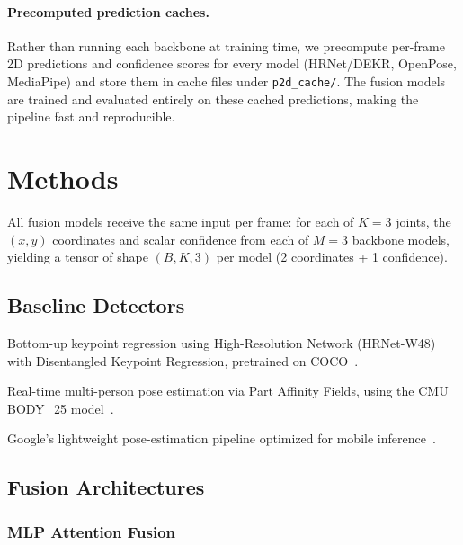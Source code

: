 \documentclass[11pt,a4paper]{article}
\begin{document}
\paragraph{Precomputed prediction caches.}
Rather than running each backbone at training time, we precompute per-frame
2D predictions and confidence scores for every model (HRNet/DEKR, OpenPose,
MediaPipe) and store them in cache files under \texttt{p2d\_cache/}.  The
fusion models are trained and evaluated entirely on these cached predictions,
making the pipeline fast and reproducible.

\section{Methods}\label{sec:methods}

All fusion models receive the same input per frame: for each of $K{=}3$ joints,
the $(x,y)$ coordinates and scalar confidence from each of $M{=}3$ backbone
models, yielding a tensor of shape $(B, K, 3)$ per model (2 coordinates + 1
confidence).

\subsection{Baseline Detectors}\label{sec:baselines}

\begin{description}[nosep, leftmargin=1em]
    \item[HRNet/DEKR] Bottom-up keypoint regression using High-Resolution
        Network (HRNet-W48) with Disentangled Keypoint Regression, pretrained
        on COCO~\cite{geng2021dekr, sun2019hrnet}.
    \item[OpenPose] Real-time multi-person pose estimation via Part Affinity
        Fields, using the CMU BODY\_25 model~\cite{cao2017openpose}.
    \item[MediaPipe] Google's lightweight pose-estimation pipeline optimized
        for mobile inference~\cite{lugaresi2019mediapipe}.
\end{description}

\subsection{Fusion Architectures}\label{sec:fusion-arch}

\subsubsection{MLP Attention Fusion}
\end{document}
